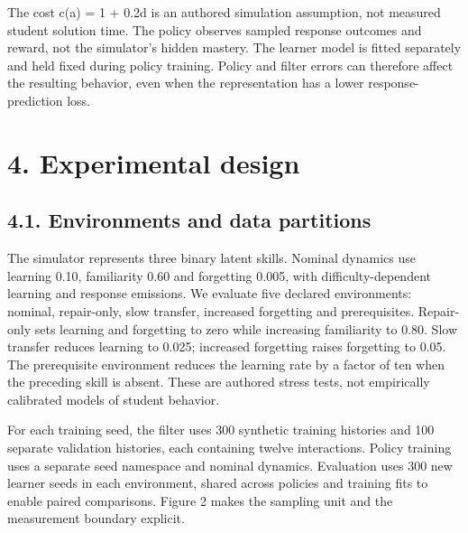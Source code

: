 \documentclass[preprint,11pt,authoryear]{elsarticle}
\begin{document}
The cost c(a) = 1 + 0.2d is an authored simulation assumption, not measured student solution time. The policy observes sampled response outcomes and reward, not the simulator's hidden mastery. The learner model is fitted separately and held fixed during policy training. Policy and filter errors can therefore affect the resulting behavior, even when the representation has a lower response-prediction loss.

\section*{4. Experimental design}

\subsection*{4.1. Environments and data partitions}

The simulator represents three binary latent skills. Nominal dynamics use learning 0.10, familiarity 0.60 and forgetting 0.005, with difficulty-dependent learning and response emissions. We evaluate five declared environments: nominal, repair-only, slow transfer, increased forgetting and prerequisites. Repair-only sets learning and forgetting to zero while increasing familiarity to 0.80. Slow transfer reduces learning to 0.025; increased forgetting raises forgetting to 0.05. The prerequisite environment reduces the learning rate by a factor of ten when the preceding skill is absent. These are authored stress tests, not empirically calibrated models of student behavior.

For each training seed, the filter uses 300 synthetic training histories and 100 separate validation histories, each containing twelve interactions. Policy training uses a separate seed namespace and nominal dynamics. Evaluation uses 300 new learner seeds in each environment, shared across policies and training fits to enable paired comparisons. Figure 2 makes the sampling unit and the measurement boundary explicit.
\end{document}
